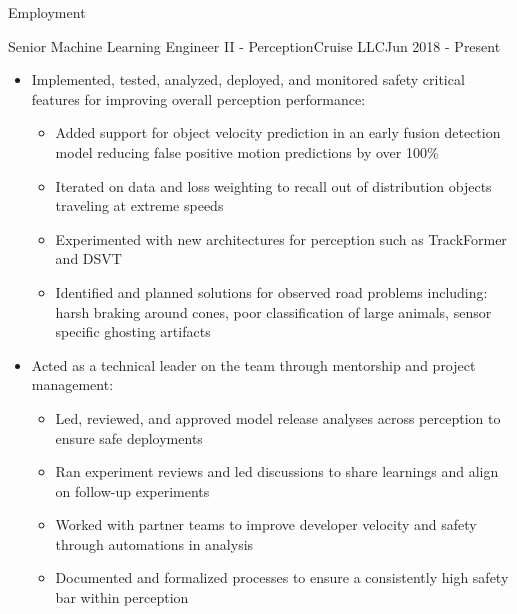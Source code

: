 \documentclass[]{mcdowellcv}
\begin{document}
\address{Seattle, WA \linebreak \href{https://www.linkedin.com/in/matthewianderson/}{linkedin.com/in/matthewianderson}}

\makeheader

\begin{cvsection}{Employment}

\begin{cruise}
    \begin{cvsubsection}{Senior Machine Learning Engineer II - Perception}{Cruise LLC}{Jun 2018 - Present}
        \begin{itemize}
            \item Implemented, tested, analyzed, deployed, and monitored safety critical features for improving overall perception performance:
            \begin{itemize}
                \item Added support for object velocity prediction in an early fusion detection model reducing false positive motion predictions by over 100\%
                \item Iterated on data and loss weighting to recall out of distribution objects traveling at extreme speeds
                \item Experimented with new architectures for perception such as TrackFormer and DSVT
                \item Identified and planned solutions for observed road problems including: harsh braking around cones, poor classification of large animals, sensor specific ghosting artifacts
            \end{itemize}
            \item Acted as a technical leader on the team through mentorship and project management:
            \begin{itemize}
                \item Led, reviewed, and approved model release analyses across perception to ensure safe deployments
                \item Ran experiment reviews and led discussions to share learnings and align on follow-up experiments
                \item Worked with partner teams to improve developer velocity and safety through automations in analysis
                \item Documented and formalized processes to ensure a consistently high safety bar within perception

\end{itemize}
\end{itemize}
\end{cvsubsection}
\end{cruise}
\end{cvsection}
\end{document}
